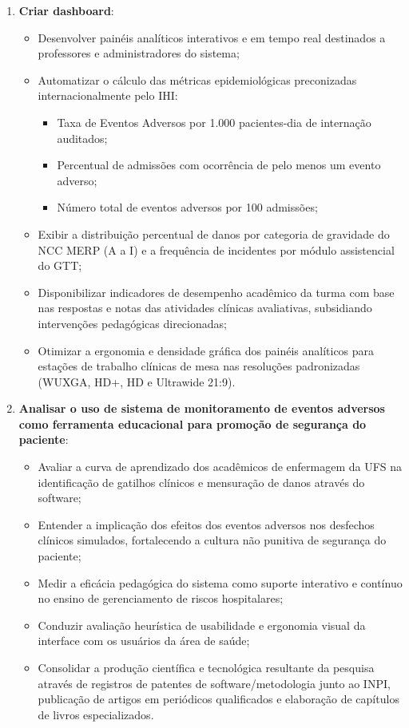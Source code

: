 \begin{enumerate}
    \item \textbf{Criar dashboard}:
    \begin{itemize}
        \item Desenvolver painéis analíticos interativos e em tempo real destinados a professores e administradores do sistema;
        \item Automatizar o cálculo das métricas epidemiológicas preconizadas internacionalmente pelo IHI:
        \begin{itemize}
            \item Taxa de Eventos Adversos por 1.000 pacientes-dia de internação auditados;
            \item Percentual de admissões com ocorrência de pelo menos um evento adverso;
            \item Número total de eventos adversos por 100 admissões;
        \end{itemize}
        \item Exibir a distribuição percentual de danos por categoria de gravidade do NCC MERP (A a I) e a frequência de incidentes por módulo assistencial do GTT;
        \item Disponibilizar indicadores de desempenho acadêmico da turma com base nas respostas e notas das atividades clínicas avaliativas, subsidiando intervenções pedagógicas direcionadas;
        \item Otimizar a ergonomia e densidade gráfica dos painéis analíticos para estações de trabalho clínicas de mesa nas resoluções padronizadas (WUXGA, HD+, HD e Ultrawide 21:9).
    \end{itemize}

    \item \textbf{Analisar o uso de sistema de monitoramento de eventos adversos como ferramenta educacional para promoção de segurança do paciente}:
    \begin{itemize}
        \item Avaliar a curva de aprendizado dos acadêmicos de enfermagem da UFS na identificação de gatilhos clínicos e mensuração de danos através do software;
        \item Entender a implicação dos efeitos dos eventos adversos nos desfechos clínicos simulados, fortalecendo a cultura não punitiva de segurança do paciente;
        \item Medir a eficácia pedagógica do sistema como suporte interativo e contínuo no ensino de gerenciamento de riscos hospitalares;
        \item Conduzir avaliação heurística de usabilidade e ergonomia visual da interface com os usuários da área de saúde;
        \item Consolidar a produção científica e tecnológica resultante da pesquisa através de registros de patentes de software/metodologia junto ao INPI, publicação de artigos em periódicos qualificados e elaboração de capítulos de livros especializados.
    \end{itemize}
\end{enumerate}
